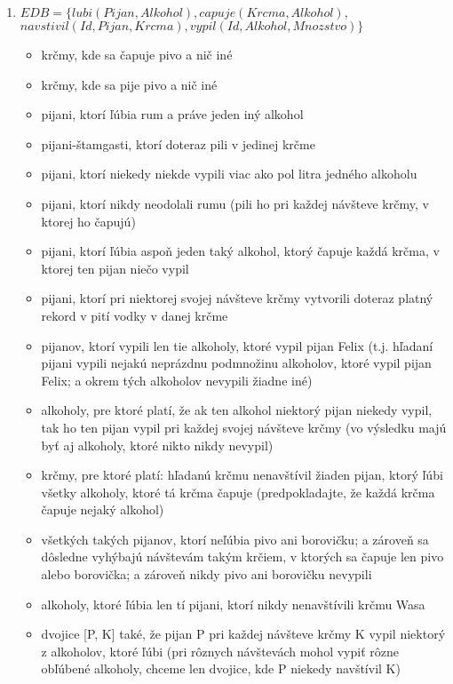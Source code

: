 \documentclass[10pt, a4paper]{article}
\begin{document}
\begin{enumerate}
\item $EDB=\{lubi(Pijan, Alkohol), capuje(Krcma, Alkohol),$\\
\hspace*{1cm} $navstivil(Id, Pijan, Krcma), vypil(Id, Alkohol, Mnozstvo)\}$
\begin{itemize}
    \item krčmy, kde sa čapuje pivo a nič iné
    \item krčmy, kde sa pije pivo a nič iné
    \item pijani, ktorí ľúbia rum a práve jeden iný alkohol
    \item pijani-štamgasti, ktorí doteraz pili v jedinej krčme
    \item pijani, ktorí niekedy niekde vypili viac ako pol litra jedného alkoholu
    \item pijani, ktorí nikdy neodolali rumu (pili ho pri každej návšteve krčmy, v ktorej ho čapujú)
    \item pijani, ktorí ľúbia aspoň jeden taký alkohol, ktorý čapuje každá krčma, v ktorej ten pijan niečo vypil
    \item pijani, ktorí pri niektorej svojej návšteve krčmy vytvorili doteraz platný rekord v pití vodky v danej krčme
    \item pijanov, ktorí vypili len tie alkoholy, ktoré vypil pijan Felix (t.j. hľadaní pijani vypili nejakú neprázdnu podmnožinu alkoholov,
            ktoré vypil pijan Felix; a okrem tých alkoholov nevypili žiadne iné)
    \item alkoholy, pre ktoré platí, že ak ten alkohol niektorý pijan niekedy vypil, tak ho ten pijan vypil pri každej svojej návšteve krčmy
            (vo výsledku majú byť aj alkoholy, ktoré nikto nikdy nevypil)
    \item krčmy, pre ktoré platí: hľadanú krčmu nenavštívil žiaden pijan, ktorý ľúbi všetky alkoholy, ktoré tá krčma čapuje (predpokladajte, že každá krčma čapuje nejaký alkohol) 
    \item všetkých takých pijanov, ktorí neľúbia pivo ani borovičku; a zároveň sa dôsledne vyhýbajú návštevám takým krčiem, v ktorých sa čapuje len pivo alebo borovička;
            a zároveň nikdy pivo ani borovičku nevypili
    \item alkoholy, ktoré ľúbia len tí pijani, ktorí nikdy nenavštívili krčmu Wasa
    \item dvojice [P, K] také, že pijan P pri každej návšteve krčmy K vypil niektorý z alkoholov, ktoré ľúbi
            (pri rôznych návštevách mohol vypiť rôzne obľúbené alkoholy, chceme len dvojice, kde P niekedy navštívil K) 

\end{itemize}
\end{enumerate}
\end{document}
